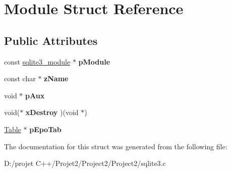 \hypertarget{struct_module}{}\section{Module Struct Reference}
\label{struct_module}
\subsection*{Public Attributes}
\begin{DoxyCompactItemize}
\item 
\mbox{\label{struct_module_a65d2539d71ea028b505b2fb33563bfd7}} 
const \mbox{\hyperlink{structsqlite3__module}{sqlite3\+\_\+module}} $\ast$ {\bfseries p\+Module}
\item 
\mbox{\label{struct_module_a45a5f5b43926b8ebf3e13e46a6534810}} 
const char $\ast$ {\bfseries z\+Name}
\item 
\mbox{\label{struct_module_ae3b827fee4c8b4f3ff38c86c2e2f48cd}} 
void $\ast$ {\bfseries p\+Aux}
\item 
\mbox{\label{struct_module_a4a4b707d6ad852cf2e8d983d22886cc1}} 
void($\ast$ {\bfseries x\+Destroy} )(void $\ast$)
\item 
\mbox{\label{struct_module_a546d1d825743f3083e7413f9f280d402}} 
\mbox{\hyperlink{struct_table}{Table}} $\ast$ {\bfseries p\+Epo\+Tab}
\end{DoxyCompactItemize}


The documentation for this struct was generated from the following file\+:\begin{DoxyCompactItemize}
\item 
D\+:/projet C++/\+Projet2/\+Project2/\+Project2/sqlite3.\+c\end{DoxyCompactItemize}
